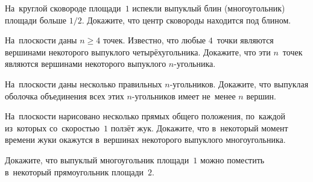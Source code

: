 


\begin{problems}

\item
На~круглой сковороде площади~$1$ испекли выпуклый блин (многоугольник) площади
больше $1/2$.
Докажите, что центр сковороды находится под блином.

\item
На~плоскости даны $n \geq 4$ точек.
Известно, что любые $4$~точки являются вершинами некоторого выпуклого
четырёхугольника.
Докажите, что эти $n$~точек являются вершинами некоторого выпуклого
$n$-угольника.

\item
На~плоскости даны несколько правильных $n$-угольников.
Докажите, что выпуклая оболочка объединения всех этих $n$-угольников имеет
не~менее $n$ вершин.



\item
На~плоскости нарисовано несколько прямых общего положения, по~каждой из~которых
со~скоростью~$1$ ползёт жук.
Докажите, что в~некоторый момент времени жуки окажутся в~вершинах некоторого
выпуклого многоугольника.

\item
Докажите, что выпуклый многоугольник площади~$1$ можно поместить в~некоторый
прямоугольник площади~$2$.


\end{problems}
